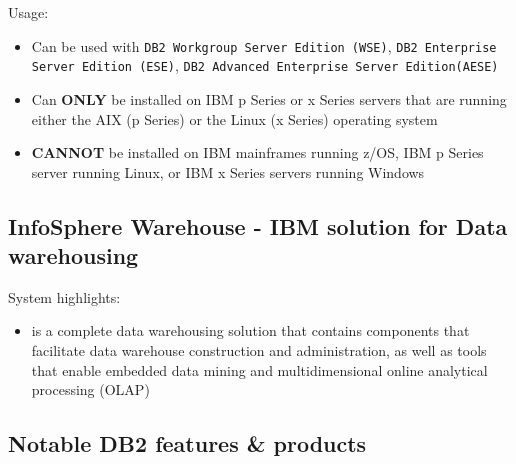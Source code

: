 \documentclass{article}
\begin{document}
\medskip

Usage:
\begin{itemize}
\item Can be used with \texttt{DB2 Workgroup Server Edition (WSE)}, \texttt{DB2 Enterprise Server Edition
(ESE)}, \texttt{DB2 Advanced Enterprise Server Edition(AESE)}
\item Can \textbf{ONLY} be installed on IBM p Series or x Series servers that are running either
the AIX (p Series) or the Linux (x Series) operating system
\item \textbf{CANNOT} be installed on IBM mainframes running z/OS, IBM p Series server running Linux,
or IBM x Series servers running Windows
\end{itemize}


\subsection{InfoSphere Warehouse - IBM solution for Data warehousing}

\medskip
System highlights:
\begin{itemize}
\item is a complete data warehousing solution that contains components that facilitate
data warehouse construction and administration, as well as tools that enable embedded data
mining and multidimensional online analytical processing (OLAP)
\end{itemize}

\subsection{Notable DB2 features \& products}
\end{document}
